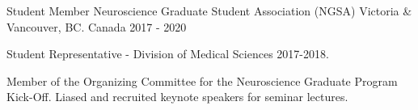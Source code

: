 \begin{cventries}
  \cventry
    {Student Member} %
    {Neuroscience Graduate Student Association (NGSA)} %
    {Victoria \& Vancouver, BC. Canada} %
    {2017 - 2020} %
    {
      \begin{cvitems} %
        \item {Student Representative - Division of Medical Sciences 2017-2018.}
        \item {Member of the Organizing Committee for the Neuroscience Graduate Program Kick-Off. Liased and recruited keynote speakers for seminar lectures.}
      \end{cvitems}
    }




\end{cventries}
